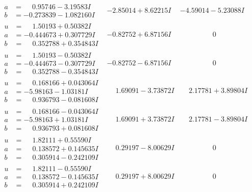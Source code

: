 \documentclass[1p]{elsarticle_modified}
\theoremstyle{definition}
\begin{document}
$$\begin{array}{c|c|c}
\begin{aligned}
a &= \phantom{-}0.95746 - 3.19583 I \\
b &= -0.273839 - 1.082160 I\end{aligned}
 & -2.85014 + 8.62215 I & -4.59014 - 5.23088 I \\ \hline\begin{aligned}
u &= \phantom{-}1.50193 + 0.50382 I \\
a &= -0.444673 + 0.307729 I \\
b &= \phantom{-}0.352788 + 0.354843 I\end{aligned}
 & -0.82752 + 6.87156 I & \phantom{-0.000000 } 0 \\ \hline\begin{aligned}
u &= \phantom{-}1.50193 - 0.50382 I \\
a &= -0.444673 - 0.307729 I \\
b &= \phantom{-}0.352788 - 0.354843 I\end{aligned}
 & -0.82752 - 6.87156 I & \phantom{-0.000000 } 0 \\ \hline\begin{aligned}
u &= \phantom{-}0.168166 + 0.043064 I \\
a &= -5.98163 - 1.03181 I \\
b &= \phantom{-}0.936793 - 0.081608 I\end{aligned}
 & \phantom{-}1.69091 - 3.73872 I & \phantom{-}2.17781 + 3.89804 I \\ \hline\begin{aligned}
u &= \phantom{-}0.168166 - 0.043064 I \\
a &= -5.98163 + 1.03181 I \\
b &= \phantom{-}0.936793 + 0.081608 I\end{aligned}
 & \phantom{-}1.69091 + 3.73872 I & \phantom{-}2.17781 - 3.89804 I \\ \hline\begin{aligned}
u &= \phantom{-}1.82111 + 0.55590 I \\
a &= \phantom{-}0.138572 + 0.145635 I \\
b &= \phantom{-}0.305914 - 0.242109 I\end{aligned}
 & \phantom{-}0.29197 - 8.00629 I & \phantom{-0.000000 } 0 \\ \hline\begin{aligned}
u &= \phantom{-}1.82111 - 0.55590 I \\
a &= \phantom{-}0.138572 - 0.145635 I \\
b &= \phantom{-}0.305914 + 0.242109 I\end{aligned}
 & \phantom{-}0.29197 + 8.00629 I & \phantom{-0.000000 } 0\\

\end{array}$$
\end{document}
